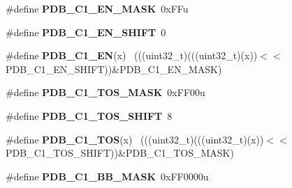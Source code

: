 \begin{DoxyCompactItemize}
\item 
\hypertarget{group___p_d_b___register___masks_ga318b4eb1bb609120bed14b19c91ef0c1}{}\#define {\bfseries P\+D\+B\+\_\+\+C1\+\_\+\+E\+N\+\_\+\+M\+A\+S\+K}~0x\+F\+Fu\label{group___p_d_b___register___masks_ga318b4eb1bb609120bed14b19c91ef0c1}

\item 
\hypertarget{group___p_d_b___register___masks_ga99bd07d734f0e46a718933179b61402b}{}\#define {\bfseries P\+D\+B\+\_\+\+C1\+\_\+\+E\+N\+\_\+\+S\+H\+I\+F\+T}~0\label{group___p_d_b___register___masks_ga99bd07d734f0e46a718933179b61402b}

\item 
\hypertarget{group___p_d_b___register___masks_ga7e9b62307eff24ef79343968a29906c5}{}\#define {\bfseries P\+D\+B\+\_\+\+C1\+\_\+\+E\+N}(x)                                                      ~(((uint32\+\_\+t)(((uint32\+\_\+t)(x))$<$$<$P\+D\+B\+\_\+\+C1\+\_\+\+E\+N\+\_\+\+S\+H\+I\+F\+T))\&P\+D\+B\+\_\+\+C1\+\_\+\+E\+N\+\_\+\+M\+A\+S\+K)\label{group___p_d_b___register___masks_ga7e9b62307eff24ef79343968a29906c5}

\item 
\hypertarget{group___p_d_b___register___masks_gabc4c3ddddcd8ab8629495457629a560e}{}\#define {\bfseries P\+D\+B\+\_\+\+C1\+\_\+\+T\+O\+S\+\_\+\+M\+A\+S\+K}~0x\+F\+F00u\label{group___p_d_b___register___masks_gabc4c3ddddcd8ab8629495457629a560e}

\item 
\hypertarget{group___p_d_b___register___masks_ga5f76b81da95cec6cc1dcbd761e48d32f}{}\#define {\bfseries P\+D\+B\+\_\+\+C1\+\_\+\+T\+O\+S\+\_\+\+S\+H\+I\+F\+T}~8\label{group___p_d_b___register___masks_ga5f76b81da95cec6cc1dcbd761e48d32f}

\item 
\hypertarget{group___p_d_b___register___masks_ga22e6c87baf70c29554cc6b03a5acbf08}{}\#define {\bfseries P\+D\+B\+\_\+\+C1\+\_\+\+T\+O\+S}(x)                                                    ~(((uint32\+\_\+t)(((uint32\+\_\+t)(x))$<$$<$P\+D\+B\+\_\+\+C1\+\_\+\+T\+O\+S\+\_\+\+S\+H\+I\+F\+T))\&P\+D\+B\+\_\+\+C1\+\_\+\+T\+O\+S\+\_\+\+M\+A\+S\+K)\label{group___p_d_b___register___masks_ga22e6c87baf70c29554cc6b03a5acbf08}

\item 
\hypertarget{group___p_d_b___register___masks_ga4e6f86caa6df500cedef06d1638194ca}{}\#define {\bfseries P\+D\+B\+\_\+\+C1\+\_\+\+B\+B\+\_\+\+M\+A\+S\+K}~0x\+F\+F0000u\label{group___p_d_b___register___masks_ga4e6f86caa6df500cedef06d1638194ca}


\end{DoxyCompactItemize}
